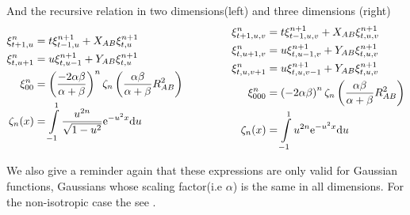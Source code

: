     And the recursive relation in two dimensions(left) and three dimensions
    (right)
        \begin{equation}
            \begin{aligned}
                \xi^n_{t+1,u} &= t\xi^{n+1}_{t-1,u} + X_{AB}\xi^{n+1}_{t,u} \\
                \xi^n_{t,u+1} &= u\xi^{n+1}_{t,u-1} + Y_{AB}\xi^{n+1}_{t,u} \\
                \xi^n_{00} &= \left(\frac{-2\alpha\beta}{\alpha+\beta}\right)^n
                \zeta_n\left(\frac{\alpha\beta}{\alpha+\beta} R^2_{AB}\right) \\
                \zeta_n(x) &= \int\limits^1_{-1} \frac{u^{2n}}{\sqrt{1 -
                u^2}} \me^{-u^2x} \md u
            \end{aligned} \indent\indent\indent 
            \begin{aligned}
                \xi^n_{t+1,u,v} &= t\xi^{n+1}_{t-1,u,v} + X_{AB}\xi^{n+1}_{t,u,v} \\
                \xi^n_{t,u+1,v} &= u\xi^{n+1}_{t,u-1,v} + Y_{AB}\xi^{n+1}_{t,u,v} \\
                \xi^n_{t,u,v+1} &= u\xi^{n+1}_{t,u,v-1} + Y_{AB}\xi^{n+1}_{t,u,v} \\
                \xi^n_{000} &= \left(-2\alpha\beta\right)^n
                \zeta_n\left(\frac{\alpha\beta}{\alpha+\beta} R^2_{AB}\right)
                \\
                \zeta_n(x) &= \int\limits^1_{-1} u^{2n} \me^{-u^2x} \md u
            \end{aligned}
        \end{equation}

    We also give a reminder again that these expressions are only valid for
     Gaussian functions, Gaussians whose scaling factor(i.e
    $\alpha$) is the same in all dimensions. For the non-isotropic case the see
    \cite{nonIsoGauss}. \\

